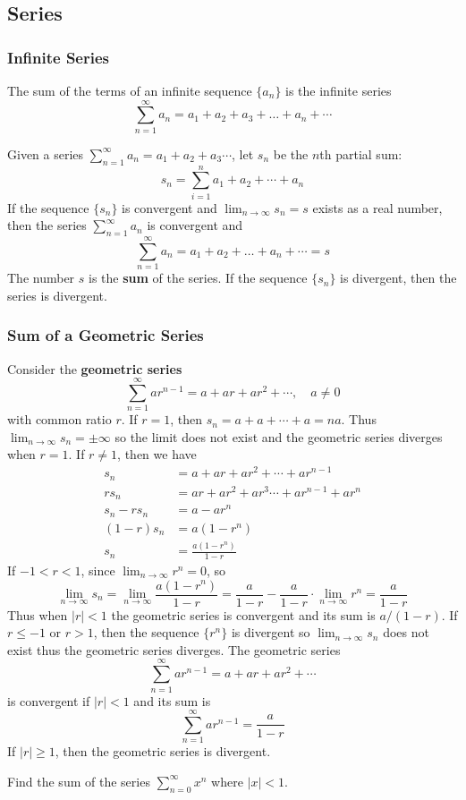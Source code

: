\subsection{Series}

\subsubsection*{Infinite Series}
The sum of the terms of an infinite sequence \(\{a_n\}\) is the infinite
series
\[\sum_{n=1}^{\infty}a_n=a_1+a_2+a_3+\dots+a_n+\cdots\]
\begin{definition}
    Given a series
    \(\displaystyle{\sum_{n=1}^{\infty}a_n=a_1+a_2+a_3\cdots}\), let \(s_n\)
    be the \(n\)th partial sum:
    \[s_n=\sum_{i=1}^n a_1+a_2+\cdots+a_n\]
    If the sequence \(\{s_n\}\) is convergent and
    \(\displaystyle{\lim_{n\to\infty}s_n=s}\) exists as a real number, then the
    series \(\displaystyle{\sum_{n=1}^\infty a_n}\) is convergent and
    \[\sum_{n=1}^{\infty}a_n=a_1+a_2+\dots+a_n+\cdots=s\]
    The number \(s\) is the \textbf{sum} of the series.
    If the sequence \(\{s_n\}\) is divergent, then the series is divergent.
\end{definition}

\subsubsection*{Sum of a Geometric Series}
Consider the \textbf{geometric series}
\[\sum_{n=1}^\infty ar^{n-1}=a+ar+ar^2+\cdots,\quad a\neq 0\]
with common ratio \(r\).
If \(r=1\), then \(s_n=a+a+\cdots+a=na\).
Thus \(\displaystyle{\lim_{n\to\infty}s_n=\pm\infty}\) so the limit does not
exist and the geometric series diverges when \(r=1\).
If \(r\neq 1\), then we have
\begin{align*}
    s_n &= a+ar+ar^2+\cdots+ar^{n-1} \\
    rs_n &= ar+ar^2+ar^3\cdots+ar^{n-1}+ar^n \\
    s_n-rs_n &= a-ar^n \\
    (1-r)s_n &= a(1-r^n) \\
    s_n &= \frac{a(1-r^n)}{1-r}
\end{align*}
If \(-1<r<1\), since \(\displaystyle{\lim_{n\to\infty}r^n}=0\), so
\[\lim_{n\to\infty}s_n=\lim_{n\to\infty}\frac{a(1-r^n)}{1-r}
=\frac{a}{1-r}-\frac{a}{1-r}\cdot\lim_{n\to\infty}r^n=\frac{a}{1-r}\]
Thus when \(|r|<1\) the geometric series is convergent and its sum is
\(a/(1-r)\).
If \(r\leq -1\) or \(r>1\), then the sequence \(\{r^n\}\) is divergent so
\(\displaystyle{\lim_{n\to\infty}s_n}\) does not exist thus the geometric
series diverges.
The geometric series
\[\sum_{n=1}^\infty ar^{n-1}=a+ar+ar^2+\cdots\]
is convergent if \(|r|<1\) and
its sum is
\[\sum_{n=1}^\infty ar^{n-1}=\frac{a}{1-r}\]
If \(|r|\geq 1\), then the geometric series is divergent.
\begin{problem}
    Find the sum of the series \(\displaystyle{\sum_{n=0}^\infty x^n}\) where
    \(|x|<1\).
\end{problem}

